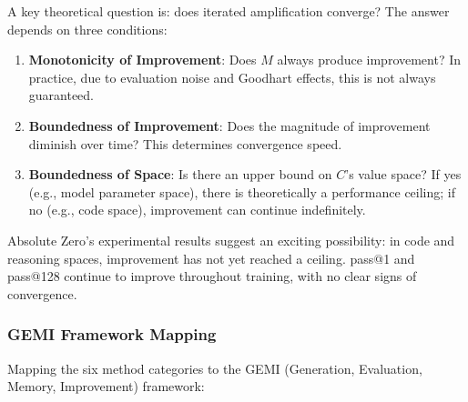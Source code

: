 A key theoretical question is: does iterated amplification converge? The answer depends on three conditions:
\begin{enumerate}
\item \textbf{Monotonicity of Improvement}: Does $M$ always produce improvement? In practice, due to evaluation noise and Goodhart effects, this is not always guaranteed.
\item \textbf{Boundedness of Improvement}: Does the magnitude of improvement diminish over time? This determines convergence speed.
\item \textbf{Boundedness of Space}: Is there an upper bound on $C$'s value space? If yes (e.g., model parameter space), there is theoretically a performance ceiling; if no (e.g., code space), improvement can continue indefinitely.
\end{enumerate}

Absolute Zero's experimental results suggest an exciting possibility: in code and reasoning spaces, improvement has not yet reached a ceiling. pass@1 and pass@128 continue to improve throughout training, with no clear signs of convergence.

\subsubsection{GEMI Framework Mapping}

Mapping the six method categories to the GEMI (Generation, Evaluation, Memory, Improvement) framework:

\begin{table}[htbp]
\centering
\caption{Mapping of six method categories under the GEMI framework.}
\label{tab:gemi-mapping}
\end{table}

